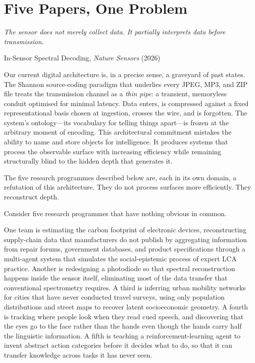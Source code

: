\documentclass[12pt, letterpaper]{article}
\theoremstyle{remark}
\begin{document}
\tableofcontents
\newpage

\section{Five Papers, One Problem}

\epigraph{\itshape The sensor does not merely collect data.  It partially
interprets data before transmission.}{In-Sensor Spectral Decoding,
\textit{Nature Sensors} (2026)}

Our current digital architecture is, in a precise sense, a graveyard of
past states.  The Shannon source-coding paradigm that underlies every JPEG,
MP3, and ZIP file treats the transmission channel as a \emph{thin pipe}: a
transient, memoryless conduit optimised for minimal latency.  Data enters,
is compressed against a fixed representational basis chosen at ingestion,
crosses the wire, and is forgotten.  The system's ontology---its vocabulary
for telling things apart---is frozen at the arbitrary moment of encoding.
This architectural commitment mistakes the ability to name and store objects
for intelligence.  It produces systems that process the observable surface
with increasing efficiency while remaining structurally blind to the hidden
depth that generates it.

The five research programmes described below are, each in its own domain,
a refutation of this architecture.  They do not process surfaces more
efficiently.  They reconstruct depth.

Consider five research programmes that have nothing obvious in common.

One team is estimating the carbon footprint of electronic devices,
reconstructing supply-chain data that manufacturers do not publish by
aggregating information from repair forums, government databases, and product
specifications through a multi-agent system that simulates the
social-epistemic process of expert LCA practice.  Another is redesigning
a photodiode so that spectral reconstruction happens inside the sensor
itself, eliminating most of the data transfer that conventional spectrometry
requires.  A third is inferring urban mobility networks for cities that have
never conducted travel surveys, using only population distributions and street
maps to recover latent socioeconomic geometry.  A fourth is tracking where
people look when they read cued speech, and discovering that the eyes go
to the face rather than the hands even though the hands carry half the
linguistic information.  A fifth is teaching a reinforcement-learning agent
to invent abstract action categories before it decides what to do, so that
it can transfer knowledge across tasks it has never seen.
\end{document}
